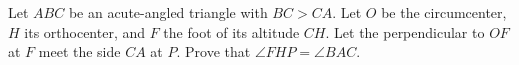 Let $ABC$ be an acute-angled triangle with $BC > CA$. Let $O$ be the circumcenter, $H$ its orthocenter, and $F$ the foot of its altitude $CH$. Let the perpendicular to $OF$ at $F$ meet the side $CA$ at $P$. Prove that $\angle FHP = \angle BAC$.
